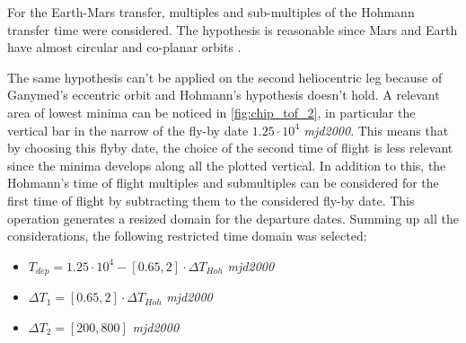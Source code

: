 For the Earth-Mars transfer, multiples and sub-multiples of the Hohmann transfer time were considered. The hypothesis is reasonable since Mars and Earth have almost circular and co-planar orbits \cite{global_optimisation}.

The same hypothesis can't be applied on the second heliocentric leg because of Ganymed's eccentric orbit and Hohmann's hypothesis doesn't hold. 
A relevant area of lowest minima can be noticed in \autoref{fig:chip_tof_2}, in particular the vertical bar in the narrow of the fly-by date $1.25 \cdot 10^4$ \textit{mjd2000}. This means that by choosing this flyby date, the choice of the second time of flight is less relevant since the minima develops along all the plotted vertical. In addition to this, the Hohmann's time of flight multiples and submultiples can be considered for the first time of flight by subtracting them to the considered fly-by date. This operation generates a resized domain for the departure dates.
Summing up all the considerations, the following restricted time domain was selected:
\begin{itemize}
    [wide,itemsep=3pt,topsep=3pt]
    \item $T_{dep} = 1.25 \cdot 10^4 - \left[0.65, 2\right]\cdot \Delta T_{Hoh} $ \textit{mjd2000}
    \item $\Delta T_1 =  \left[0.65, 2\right]\cdot \Delta T_{Hoh}$ \textit{mjd2000}
    \item $\Delta T_2 = \left[200, 800\right]$ \textit{mjd2000}
\end{itemize}


\label{subsec:final_window}